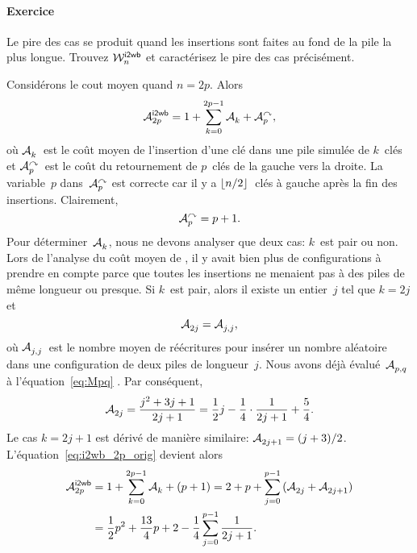 \paragraph{Exercice}

Le pire des cas se produit quand les insertions sont faites au fond de
la pile la plus longue. Trouvez \(\W{\fun{i2wb}}{n}\) et caractérisez
le pire des cas précisément.


Considérons le cout moyen quand \(n=2p\). Alors
\begin{equation}
\M{\fun{i2wb}}{2p} =
  1 + \sum_{k=0}^{2p-1}{\M{}{k}} + \M{\curvearrowright}{p},
\label{eq:i2wb_2p_orig}
\end{equation}
où \(\M{}{k}\)~est le coût moyen de l'insertion d'une clé dans une
pile simulée de \(k\)~clés et
\(\M{\curvearrowright}{p}\)~est
le coût du retournement de \(p\)~clés de la gauche vers la droite. La
variable~\(p\) dans~\(\M{\curvearrowright}{p}\) est correcte car il y
a \(\floor{n/2}\)~clés à gauche après la fin des
insertions. Clairement,
\begin{equation*}
\M{\curvearrowright}{p} = p + 1.
\end{equation*}
Pour déterminer~\(\M{}{k}\), nous ne devons analyser que deux cas:
\(k\)~est pair ou non. Lors de l'analyse du coût moyen de ,
il y avait bien plus de configurations à prendre en compte parce que
toutes les insertions ne menaient pas à des piles de même longueur ou
presque. Si \(k\)~est pair, alors il existe un entier~\(j\) tel que
\(k=2j\) et
\begin{equation*}
\M{}{2j} = \M{}{j,j},
\end{equation*}
où \(\M{}{j,j}\)~est le nombre moyen de réécritures pour insérer un
nombre aléatoire dans une configuration de deux piles de
longueur~\(j\). Nous avons déjà évalué~\(\M{}{p,q}\) à
l'équation~\eqref{eq:Mpq} . Par conséquent,
\begin{equation*}
\M{}{2j} = \frac{j^2 + 3j + 1}{2j+1}
         = \frac{1}{2}{j} - \frac{1}{4} \cdot \frac{1}{2j+1} +
         \frac{5}{4}.
\end{equation*}
Le cas \(k=2j+1\) est dérivé de manière similaire: \(\M{}{2j+1} =
(j+3)/2\). L'équation~\eqref{eq:i2wb_2p_orig} devient alors
\begin{align}
\M{\fun{i2wb}}{2p}
  &= 1 + \sum_{k=0}^{2p-1}{\M{}{k}} + (p+1)
   = 2 + p + \sum_{j=0}^{p-1}{(\M{}{2j} + \M{}{2j+1})}\notag\\
  &= \frac{1}{2}{p^2} + \frac{13}{4}{p} + 2 -
             \frac{1}{4}\sum_{j=0}^{p-1}{\frac{1}{2j+1}}.
\label{eq:i2wb_2p}
\end{align}
